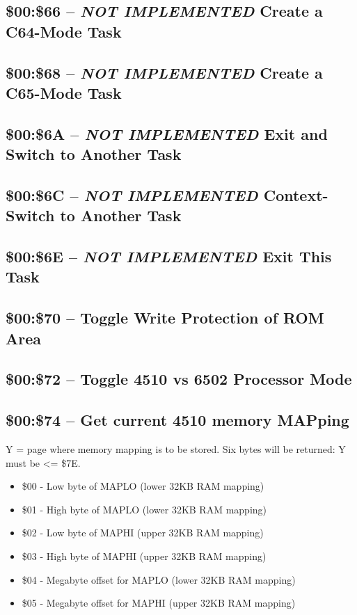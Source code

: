 \subsection{\$00:\$66 -- {\em NOT IMPLEMENTED} Create a C64-Mode Task}
\subsection{\$00:\$68 -- {\em NOT IMPLEMENTED} Create a C65-Mode Task}
\subsection{\$00:\$6A -- {\em NOT IMPLEMENTED} Exit and Switch to Another Task}
\subsection{\$00:\$6C -- {\em NOT IMPLEMENTED} Context-Switch to Another Task}
\subsection{\$00:\$6E -- {\em NOT IMPLEMENTED} Exit This Task}

\subsection{\$00:\$70 -- Toggle Write Protection of ROM Area}
\subsection{\$00:\$72 -- Toggle 4510 vs 6502 Processor Mode}
\subsection{\$00:\$74 -- Get current 4510 memory MAPping}

Y = page where memory mapping is to be stored.  Six bytes will be returned:
Y must be <= \$7E.

\begin{itemize}
  \item \$00 - Low byte of MAPLO (lower 32KB RAM mapping)
  \item \$01 - High byte of MAPLO (lower 32KB RAM mapping)
  \item \$02 - Low byte of MAPHI (upper 32KB RAM mapping)
  \item \$03 - High byte of MAPHI (upper 32KB RAM mapping)
  \item \$04 - Megabyte offset for MAPLO (lower 32KB RAM mapping)
  \item \$05 - Megabyte offset for MAPHI (upper 32KB RAM mapping)
\end{itemize}

